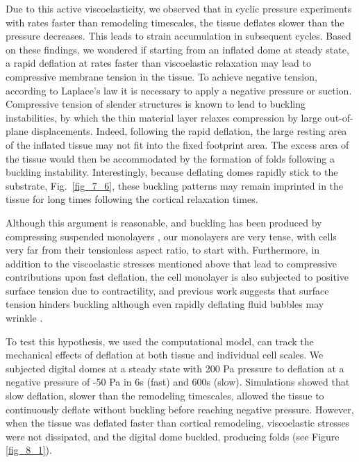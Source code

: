 Due to this active viscoelasticity, we observed that in cyclic pressure experiments with rates faster than remodeling timescales, the tissue deflates slower than the pressure decreases. This leads to strain accumulation in subsequent cycles. Based on these findings, we wondered if starting from an inflated dome at steady state, a rapid deflation at rates faster than viscoelastic relaxation may lead to compressive membrane tension in the tissue.  To achieve negative tension, according to Laplace's law it is necessary to apply a negative pressure or suction. Compressive tension of slender structures is known to lead to buckling instabilities, by which the thin material layer relaxes compression by large out-of-plane displacements. Indeed, following the rapid deflation, the large resting area of the inflated tissue may not fit into the fixed footprint area. The excess area of the tissue would then be accommodated by the formation of folds following a buckling instability. Interestingly, because deflating domes rapidly stick to the substrate, Fig.~\ref{fig_7_6}, these buckling patterns may remain imprinted in the tissue for long times following the cortical relaxation times. 


Although this argument is reasonable, and buckling has been produced by compressing suspended monolayers \cite{wyatt2020}, our monolayers are very tense, with cells very far from their tensionless aspect ratio, to start with. Furthermore, in addition to the viscoelastic stresses mentioned above that lead to compressive contributions upon fast deflation, the cell monolayer is also subjected to positive surface tension due to contractility, and  previous work suggests that surface tension hinders buckling \cite{PhysRevLett.109.064502} although even rapidly deflating fluid bubbles may wrinkle \cite{doi:10.1126/science.aba0593}. 

To test this hypothesis, we used the computational model, can track the mechanical effects of deflation at both tissue and individual cell scales. We subjected digital domes at a steady state with 200 Pa pressure to deflation at a negative pressure of -50 Pa in 6s (fast) and 600s (slow). Simulations showed that slow deflation, slower than the remodeling timescales, allowed the tissue to continuously deflate without buckling before reaching negative pressure. However, when the tissue was deflated faster than cortical remodeling, viscoelastic stresses were not dissipated, and the digital dome buckled, producing folds (see Figure \ref{fig_8_1}).


